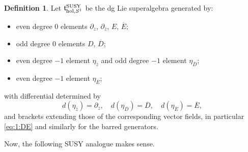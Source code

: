 \documentclass[final,reqno]{amsart}
\numberwithin{equation}{section}
\theoremstyle{definition}
\newtheorem{dfn}[thm]{Definition}
\newcommand{\ol}{\overline}
\newcommand{\lto}{\longrightarrow}
\newcommand{\hol}{\textup{hol}}
\newcommand{\SUSY}{\textup{SUSY}}
\newcommand{\bbC}{\mathbb{C}}
\newcommand{\sC}{\mathbb{C}^{1|1}}
\newcommand{\clF}{\mathcal{F}}
\newcommand{\sfC}{\mathsf{C}}
\newcommand{\frt}{\mathfrak{t}}
\newcommand{\pd}{\partial}
\DeclareMathOperator{\Der}{Der}
\DeclareMathOperator{\Disk}{\mathsf{Disks}}
\begin{document}
\begin{dfn}
Let $\frt^{\SUSY}_{\mathrm{hol},S^1}$ be the dg Lie superalgebra generated by:
\begin{itemize}
\item 
even degree $0$ elements $\pd_z$, $\pd_{\ol{z}}$, $E$, $\ol{E}$;
\item 
odd degree $0$ elements $D$, $\ol{D}$;
\item 
even degree $-1$ element $\eta_{\ol{z}}$ and 
odd degree $-1$ element $\eta_{\ol{D}}$;
\item 
even degree $-1$ element $\eta_{\ol{E}}$;
\end{itemize}
with differential determined by
\[
 d(\eta_{\ol{z}})=\pd_{\ol{z}}, \quad 
 d(\eta_{\ol{D}})=\ol{D}, \quad 
 d(\eta_{\ol{E}})=\ol{E},
\]
and brackets extending those of the corresponding vector fields, 
in particular \eqref{eq:1:DE} and similarly for the barred generators.
\end{dfn}

Now, the following SUSY analogue makes sense. 

\end{document}
